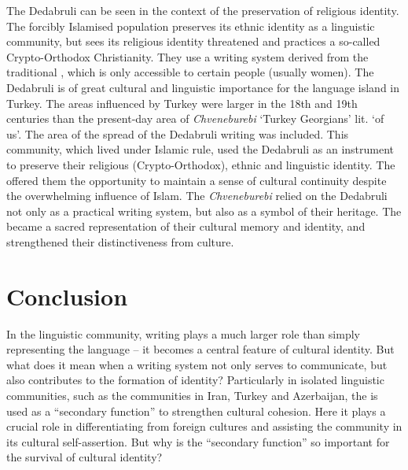 \documentclass[output=paper,colorlinks,citecolor=brown,arabicfont,georgian]{langscibook}
\begin{document}
The Dedabruli  can be seen in the context of the preservation of religious identity. The forcibly Islamised population preserves its ethnic identity as a linguistic community, but sees its religious identity threatened and practices a so-called Crypto-Orthodox Christianity. They use a writing system derived from the traditional  , which is only accessible to certain people (usually women). The Dedabruli  is of great cultural and linguistic importance for the  language island in Turkey. The areas influenced by Turkey were larger in the 18th and 19th centuries than the present-day area of  \textit{Chveneburebi} `Turkey Georgians' lit. `of us'. 
The area of the spread of the Dedabruli writing was included. This community, which lived under Islamic rule, used the Dedabruli  as an instrument to preserve their religious (Crypto-Orthodox), ethnic and linguistic identity. The  offered them the opportunity to maintain a sense of cultural continuity despite the overwhelming influence of Islam. The \textit{Chveneburebi} relied on the Dedabruli  not only as a practical writing system, but also as a symbol of their  heritage. The  became a sacred representation of their cultural memory and identity, and strengthened their distinctiveness from  culture.

\section{Conclusion}\label{3.8.ss.3}

In the  linguistic community, writing plays a much larger role than simply representing the language -- it becomes a central feature of cultural identity. But what does it mean when a writing system not only serves to communicate, but also contributes to the formation of identity? Particularly in isolated linguistic communities, such as the  communities in Iran, Turkey and Azerbaijan, the   is used as a ``secondary function'' to strengthen cultural cohesion. Here it plays a crucial role in differentiating from foreign cultures and assisting the community in its cultural self-assertion. But why is the ``secondary function'' so important for the survival of cultural identity?
\end{document}
